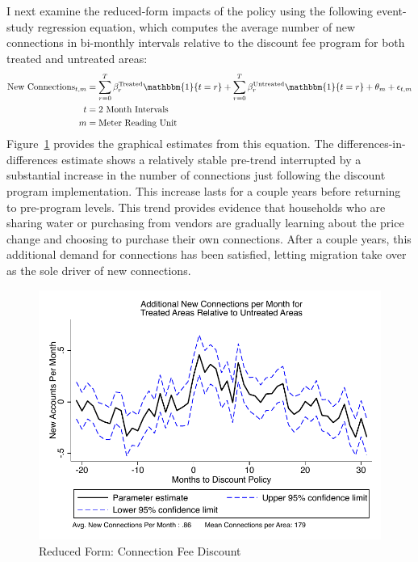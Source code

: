 \documentclass[12pt]{article}
\begin{document}
\begin{appendices}
I next examine the reduced-form impacts of the policy using the following event-study regression equation, which computes the average number of new connections in bi-monthly intervals relative to the discount fee program for both treated and untreated areas:
\begin{align*}
\text{New Connections}_{t,m} &= \sum_{r=0}^{T} \beta^{\text{Treated}}_{r} \mathbbm{1} \{t=r\} + \sum_{r=0}^{T} \beta^{\text{Untreated}}_{r} \mathbbm{1} \{t=r\}  +  \theta_{m} + \epsilon_{t,m} \\
t &= \text{2 Month Intervals}\\
m &= \text{Meter Reading Unit}
\end{align*}
Figure~\ref{figure:discountreducedform} provides the graphical estimates from this equation.  The differences-in-differences estimate shows a relatively stable pre-trend interrupted by a substantial increase in the number of connections just following the discount program implementation.  This increase lasts for a couple years before returning to pre-program levels.  This trend provides evidence that households who are sharing water or purchasing from vendors are gradually learning about the price change and choosing to purchase their own connections.  After a couple years, this additional demand for connections has been satisfied, letting migration take over as the sole driver of new connections.
\begin{figure}
\centering
\caption{Reduced Form: Connection Fee Discount}\label{figure:discountreducedform}
\includegraphics[scale=.8]{tables/diff_595.pdf}
\end{figure}


\end{appendices}
\end{document}

